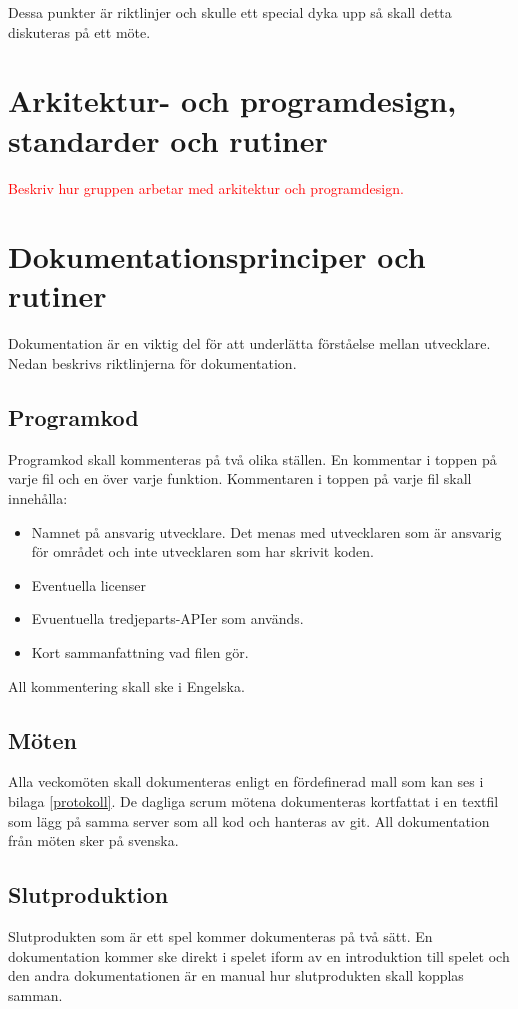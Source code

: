 \documentclass[a4paper,12pt,oneside,final]{extbook}
\begin{document}
Dessa punkter är riktlinjer och skulle ett special dyka upp så skall detta diskuteras på ett möte.


\section{Arkitektur- och programdesign, standarder och rutiner}

\textcolor{red}{Beskriv hur gruppen arbetar med arkitektur och programdesign.}
\section{Dokumentationsprinciper och rutiner}
Dokumentation är en viktig del för att underlätta förståelse mellan utvecklare. Nedan beskrivs riktlinjerna för dokumentation.

\subsection{Programkod}
Programkod skall kommenteras på två olika ställen. En kommentar i toppen på varje fil och en över varje funktion. Kommentaren i toppen på varje fil skall innehålla:
\begin{itemize}
	\item Namnet på ansvarig utvecklare. Det menas med utvecklaren som är ansvarig för området och inte utvecklaren som har skrivit koden.
	\item Eventuella licenser
	\item Evuentuella tredjeparts-APIer som används.
	\item Kort sammanfattning vad filen gör.
\end{itemize}
All kommentering skall ske i Engelska.
\subsection{Möten}
Alla veckomöten skall dokumenteras enligt en fördefinerad mall som kan ses i bilaga \ref{protokoll}. De dagliga scrum mötena dokumenteras kortfattat i en textfil som lägg på samma server som all kod och hanteras av git. All dokumentation från möten sker på svenska.
\subsection{Slutproduktion}
Slutprodukten som är ett spel kommer dokumenteras på två sätt. En dokumentation kommer ske direkt i spelet iform av en introduktion till spelet och den andra dokumentationen är en manual hur slutprodukten skall kopplas samman. 
\end{document}
